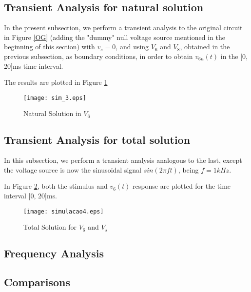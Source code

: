 \newpage



\subsection{Transient Analysis for natural solution}
\label{subsec:trans_nat}

In the present subsection, we perform a transient analysis to the original circuit in Figure \ref{OG} (adding the "dummy" null voltage source mentioned in the beginning of this section) with $v_s = 0$, and using $V_6$ and $V_8$, obtained in the previous subsection, as boundary conditions, in order to obtain $v_{6n}(t)$ in the [0, 20]ms time interval.

The results are plotted in Figure \ref{plot3S}
\begin{figure}[h]
\centering
\caption{Natural Solution in $V_6$}
\texttt{[image: sim\_3.eps]}
\label{plot3S}
\end{figure}

\newpage


\subsection{Transient Analysis for total solution}
\label{subsec:trans_total}

In this subsection, we perform a transient analysis analogous to the last, except the voltage source is now the sinusoidal signal $sin(2 \pi f t)$, being $f = 1kHz$.

In Figure \ref{plot4S}, both the stimulus and $v_6(t)$ response are plotted for the time interval [0, 20]ms.

\begin{figure}[h]
\centering
\caption{Total Solution for $V_6$ and $V_s$}
\texttt{[image: simulacao4.eps]}
\label{plot4S}
\end{figure}

\newpage

\subsection{Frequency Analysis}
\label{subsec:freq_sim}



\subsection{Comparisons}

